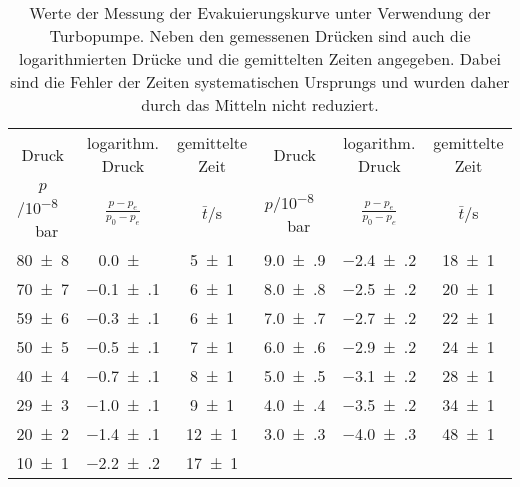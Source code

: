 \begin{table}[!h]
	\centering
	\begin{adjustbox}{width=\textwidth}
	\begin{tabular}{cccccc}
		\toprule
		Druck & logarithm. Druck & gemittelte Zeit & Druck & logarithm. Druck & gemittelte Zeit\\
		$p$/\si{10^{-8}\,bar} & $\frac{p-p_e}{p_0-p_e}$ & $\bar{t}$/\si{s} & $p$/\si{10^{-8}\,bar} & $\frac{p-p_e}{p_0-p_e}$ & $\bar{t}$/\si{s}\\
\midrule
		\num{80(8)} & \num{0.0(0)} & \num{5(1)} & \num{9.0(9)} & \num{-2.4(2)} & \num{18(1)}\\
		\num{70(7)} & \num{-0.1(1)} & \num{6(1)} & \num{8.0(8)} & \num{-2.5(2)} & \num{20(1)}\\
		\num{59(6)} & \num{-0.3(1)} & \num{6(1)} & \num{7.0(7)} & \num{-2.7(2)} & \num{22(1)}\\
		\num{50(5)} & \num{-0.5(1)} & \num{7(1)} & \num{6.0(6)} & \num{-2.9(2)} & \num{24(1)}\\
		\num{40(4)} & \num{-0.7(1)} & \num{8(1)} & \num{5.0(5)} & \num{-3.1(2)} & \num{28(1)}\\
		\num{29(3)} & \num{-1.0(1)} & \num{9(1)} & \num{4.0(4)} & \num{-3.5(2)} & \num{34(1)}\\
		\num{20(2)} & \num{-1.4(1)} & \num{12(1)} & \num{3.0(3)} & \num{-4.0(3)} & \num{48(1)}\\
		\num{10(1)} & \num{-2.2(2)} & \num{17(1)}\\
		\bottomrule
	\end{tabular}
	\end{adjustbox}
	\caption{Werte der Messung der Evakuierungskurve unter Verwendung der Turbopumpe.
                        Neben den gemessenen Drücken sind auch die logarithmierten Drücke und die gemittelten
                        Zeiten angegeben. Dabei sind die Fehler der Zeiten systematischen Ursprungs und wurden 
                        daher durch das Mitteln nicht reduziert. \label{tab:Evakuierungskurve_Turbo}}
\end{table}

